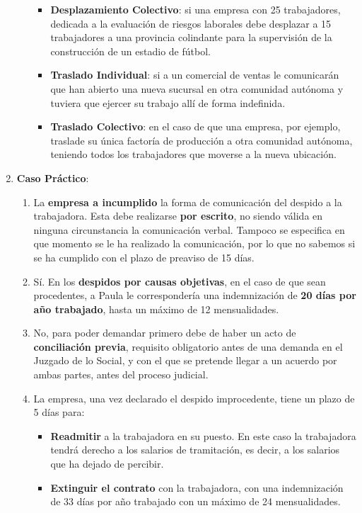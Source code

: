 \begin{enumerate}
\begin{enumerate}
\begin{itemize}
        \item \textbf{Desplazamiento Colectivo}: si una empresa con 25 trabajadores, dedicada a la evaluación de riesgos laborales debe desplazar a 15  trabajadores a una provincia colindante para la supervisión de la construcción de un estadio de fútbol.

        \item \textbf{Traslado Individual}: si a un comercial de ventas le comunicarán que han abierto una nueva sucursal en otra comunidad autónoma y tuviera que ejercer su trabajo allí de forma indefinida.

        \item \textbf{Traslado Colectivo}: en el caso de que una empresa, por ejemplo, traslade su única factoría de producción a otra comunidad autónoma, teniendo todos los trabajadores que moverse a la nueva ubicación.
    \end{itemize}
    \end{enumerate}


    \item \textbf{Caso Práctico}:

    \begin{enumerate}
        \item La \textbf{empresa a incumplido} la forma de comunicación del despido a la trabajadora. Esta debe realizarse \textbf{por escrito}, no siendo válida en ninguna circunstancia la comunicación verbal. Tampoco se especifica en que momento se le ha realizado la comunicación, por lo que no sabemos si se ha cumplido con el plazo de preaviso  de 15 días.

        \item Sí. En los \textbf{despidos por causas objetivas}, en el caso de que sean procedentes, a Paula le correspondería una indemnización de \textbf{20 días por año trabajado}, hasta un máximo de 12 mensualidades.

        \item No, para poder demandar primero debe de haber un acto de \textbf{conciliación previa}, requisito obligatorio antes de una demanda en el Juzgado de lo Social, y con el que se pretende llegar a un acuerdo por ambas partes, antes del proceso judicial.

        \item La empresa, una vez declarado el despido improcedente, tiene un plazo de 5 días para:
        \begin{itemize}
            \item \textbf{Readmitir} a la trabajadora en su puesto. En este caso la trabajadora tendrá derecho a los salarios de tramitación, es decir, a los salarios que ha dejado de percibir.
            \item \textbf{Extinguir el contrato} con la trabajadora, con una indemnización de 33 días por año trabajado con un máximo de 24 mensualidades.
        \end{itemize}


\end{enumerate}
\end{enumerate}
